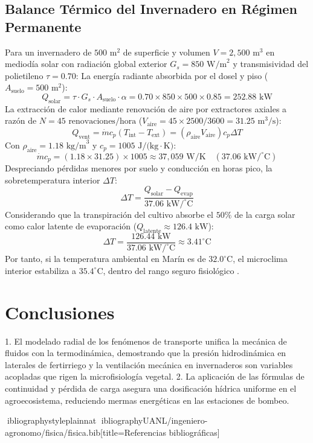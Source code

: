 \documentclass[spanish,letterpaper,oneside]{article}
\begin{document}
\subsection{Balance Térmico del Invernadero en Régimen Permanente}
Para un invernadero de $500\text{ m}^2$ de superficie y volumen $V = 2,500\text{ m}^3$ en mediodía solar con radiación global exterior $G_s = 850\text{ W/m}^2$ y transmisividad del polietileno $\tau = 0.70$:
La energía radiante absorbida por el dosel y piso ($A_{\text{suelo}} = 500\text{ m}^2$):
\begin{equation}
    Q_{\text{solar}} = \tau \cdot G_s \cdot A_{\text{suelo}} \cdot \alpha = 0.70 \times 850 \times 500 \times 0.85 = 252.88\text{ kW}
\end{equation}
La extracción de calor mediante renovación de aire por extractores axiales a razón de $N = 45\text{ renovaciones/hora}$ ($V_{\text{aire}} = 45 \times 2500 / 3600 = 31.25\text{ m}^3\text{/s}$):
\begin{equation}
    Q_{\text{vent}} = \dot{m} c_p (T_{\text{int}} - T_{\text{ext}}) = (\rho_{\text{aire}} V_{\text{aire}}) c_p \Delta T
\end{equation}
Con $\rho_{\text{aire}} = 1.18\text{ kg/m}^3$ y $c_p = 1005\text{ J/(kg}\cdot\text{K)}$:
\begin{equation}
    \dot{m} c_p = (1.18 \times 31.25) \times 1005 \approx 37,059\text{ W/K} \quad (37.06\text{ kW/}^\circ\text{C})
\end{equation}
Despreciando pérdidas menores por suelo y conducción en horas pico, la sobretemperatura interior $\Delta T$:
\begin{equation}
    \Delta T = \frac{Q_{\text{solar}} - Q_{\text{evap}}}{37.06\text{ kW/}^\circ\text{C}}
\end{equation}
Considerando que la transpiración del cultivo absorbe el $50\%$ de la carga solar como calor latente de evaporación ($Q_{\text{latente}} \approx 126.4\text{ kW}$):
\begin{equation}
    \Delta T = \frac{126.44\text{ kW}}{37.06\text{ kW/}^\circ\text{C}} \approx 3.41^\circ\text{C}
\end{equation}
Por tanto, si la temperatura ambiental en Marín es de $32.0^\circ\text{C}$, el microclima interior estabiliza a $35.4^\circ\text{C}$, dentro del rango seguro fisiológico \parencite{tipler2010}.

\section{Conclusiones}
1. El modelado radial de los fenómenos de transporte unifica la mecánica de fluidos con la termodinámica, demostrando que la presión hidrodinámica en laterales de fertirriego y la ventilación mecánica en invernaderos son variables acopladas que rigen la microfisiología vegetal.
2. La aplicación de las fórmulas de continuidad y pérdida de carga asegura una dosificación hídrica uniforme en el agroecosistema, reduciendo mermas energéticas en las estaciones de bombeo.

\newpage
ibliographystyle{plainnat}
ibliography{UANL/ingeniero-agronomo/fisica/fisica.bib}[title={Referencias bibliográficas}]
\end{document}
